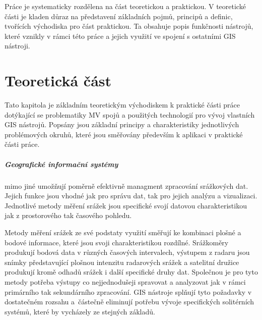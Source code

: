 \documentclass[a4paper,12pt,oneside]{report}
\begin{document}
Práce je systematicky rozdělena na část teoretickou a praktickou. V
teoretické části je kladen důraz na představení základních pojmů,
principů a definic, tvořících východiska pro část praktickou. Ta
obsahuje popis funkčnosti nástrojů, které vznikly v rámci této práce a
 jejich využití ve spojení s ostatními GIS nástroji.

 



\newpage
\chapter*{Teoretická
  část}

Tato kapitola je základním teoretickým východiskem k praktické části
práce dotýkající se problematiky MV spojů a použitých technologií pro
vývoj vlastních GIS nástrojů.
Popsány jsou základní principy a charakteristiky jednotlivých
problémových okruhů, které jsou směřovány především k aplikaci v
praktické části práce.


\paragraph*{Geografické informační systémy} mimo jiné umožňují poměrně
efektivně managment zpracování sráž\-kových dat. Jejich funkce jsou
vhodné jak pro správu dat, tak pro jejich analýzu a
vizualizaci. Jednotlivé metody měření srážek jsou specifické svojí
datovou charakteristikou jak z prostorového tak časového pohledu.

Metody měření srážek ze své podstaty využití směřují ke kombinaci
plošné a bodové informace, které jsou svoji charakteristikou
rozdílné. Srážkoměry produkují bodová data v různých časových
intervalech, výstupem z radaru jsou snímky představující plošnou
intenzitu radarových srážek a satelitní družice produkují kromě odhadů
srážek i další specifické druhy dat. Společnou je pro tyto metody
potřeba výstupy co nejjednodušeji spravovat a analyzovat jak v rámci
primárního tak sekundá\-rního zpracování. GIS nástroje splňují tyto
požadavky v dostatečném rozsahu a~částečně eliminují potřebu vývoje
specifických solitérních systémů, které by vychá\-zely ze stejných
základů.
\end{document}
